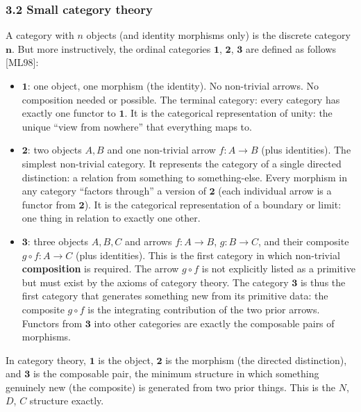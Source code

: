\documentclass[
  11pt,
  letterpaper,
]{article}
\begin{document}
\subsubsection{3.2 Small category theory}\label{small-category-theory}

A category with \(n\) objects (and identity morphisms only) is the
discrete category \(\mathbf{n}\). But more instructively, the ordinal
categories \(\mathbf{1}\), \(\mathbf{2}\), \(\mathbf{3}\) are defined as
follows {[}ML98{]}:

\begin{itemize}
\item
  \(\mathbf{1}\): one object, one morphism (the identity). No
  non-trivial arrows. No composition needed or possible. The terminal
  category: every category has exactly one functor to \(\mathbf{1}\). It
  is the categorical representation of unity: the unique ``view from
  nowhere'' that everything maps to.
\item
  \(\mathbf{2}\): two objects \(A, B\) and one non-trivial arrow
  \(f: A \to B\) (plus identities). The simplest non-trivial category.
  It represents the category of a single directed distinction: a
  relation from something to something-else. Every morphism in any
  category ``factors through'' a version of \(\mathbf{2}\) (each
  individual arrow is a functor from \(\mathbf{2}\)). It is the
  categorical representation of a boundary or limit: one thing in
  relation to exactly one other.
\item
  \(\mathbf{3}\): three objects \(A, B, C\) and arrows \(f: A \to B\),
  \(g: B \to C\), and their composite \(g \circ f: A \to C\) (plus
  identities). This is the first category in which non-trivial
  \textbf{composition} is required. The arrow \(g \circ f\) is not
  explicitly listed as a primitive but must exist by the axioms of
  category theory. The category \(\mathbf{3}\) is thus the first
  category that generates something new from its primitive data: the
  composite \(g \circ f\) is the integrating contribution of the two
  prior arrows. Functors from \(\mathbf{3}\) into other categories are
  exactly the composable pairs of morphisms.
\end{itemize}

In category theory, \(\mathbf{1}\) is the object, \(\mathbf{2}\) is the
morphism (the directed distinction), and \(\mathbf{3}\) is the
composable pair, the minimum structure in which something genuinely new
(the composite) is generated from two prior things. This is the \(N\),
\(D\), \(C\) structure exactly.
\end{document}
